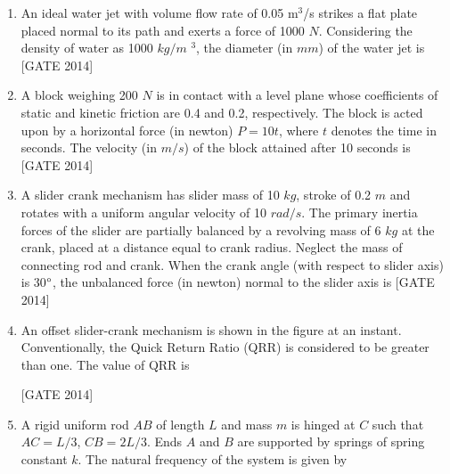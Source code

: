 \documentclass[journal,12pt,onecolumn]{IEEEtran}
\theoremstyle{remark}
\begin{document}
\begin{enumerate}
    \item An ideal water jet with volume flow rate of 0.05 m$^3$/s strikes a flat plate placed normal to its path and exerts a force of 1000 $N$. Considering the density of water as 1000 $kg/m$ $^3$, the diameter (in $mm$) of the water jet is \underline{\hspace{2cm}} \hfill{[GATE 2014]}\\
 

    \item A block weighing 200 $N$ is in contact with a level plane whose coefficients of static and kinetic friction are 0.4 and 0.2, respectively. The block is acted upon by a horizontal force (in newton) $P = 10t$, where $t$ denotes the time in seconds. The velocity (in $m/s$) of the block attained after 10 seconds is \underline{\hspace{2cm}} \hfill{[GATE 2014]}\\

      \item A slider crank mechanism has slider mass of 10 $kg$, stroke of 0.2 $m$ and rotates with a uniform angular velocity of 10 $rad/s$. The primary inertia forces of the slider are partially balanced by a revolving mass of 6 $kg$ at the crank, placed at a distance equal to crank radius. Neglect the mass of connecting rod and crank. When the crank angle (with respect to slider axis) is 30$\degree$, the unbalanced force (in newton) normal to the slider axis is\underline{\hspace{2cm}} \hfill{[GATE 2014]}
\\
 \item An offset slider-crank mechanism is shown in the figure at an instant. Conventionally, the Quick  Return Ratio (QRR) is considered to be greater than one. The value of QRR is 

 
\begin{centering}
  
   
\end{centering}\hfill{[GATE 2014]}
 \\

  
\item A rigid uniform rod $AB$ of length $L$ and mass $m$ is hinged at $C$ such that $AC = L/3$, $CB = 2L/3$. Ends $A$ and $B$ are supported by springs of spring constant $k$. The natural frequency of the system is given by \\


\begin{centering}
     



\end{centering}
\end{enumerate}
\end{document}
